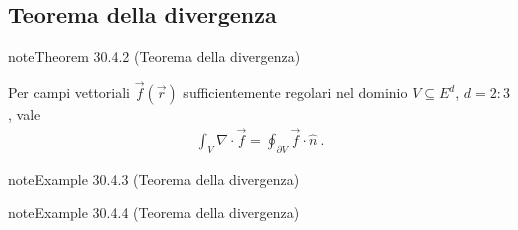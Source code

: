 \documentclass[letterpaper,10pt,italian]{jupyterBook}
\begin{document}
\subsection{Teorema della divergenza}
\label{\detokenize{ch/vector-calculus/stokes:teorema-della-divergenza}}\label{\detokenize{ch/vector-calculus/stokes:vector-calculus-stokes-divergence}}\label{ch/vector-calculus/stokes:thm-divergence}
\begin{sphinxadmonition}{note}{Theorem 30.4.2 (Teorema della divergenza)}



\sphinxAtStartPar
Per campi vettoriali \(\vec{f}(\vec{r})\) sufficientemente regolari nel dominio \(V \subseteq E^d\), \(d=2:3\), vale
\begin{equation}\label{equation:ch/vector-calculus/stokes:eq:thm-divergence}
\begin{split}\int_{V} \nabla \cdot \vec{f} = \oint_{\partial V} \vec{f} \cdot \hat{n} \ .\end{split}
\end{equation}\end{sphinxadmonition}
\label{ch/vector-calculus/stokes:thm-divergence-1}
\begin{sphinxadmonition}{note}{Example 30.4.3 (Teorema della divergenza)}


\end{sphinxadmonition}
\label{ch/vector-calculus/stokes:thm-divergence-2}
\begin{sphinxadmonition}{note}{Example 30.4.4 (Teorema della divergenza)}


\end{sphinxadmonition}
\end{document}
